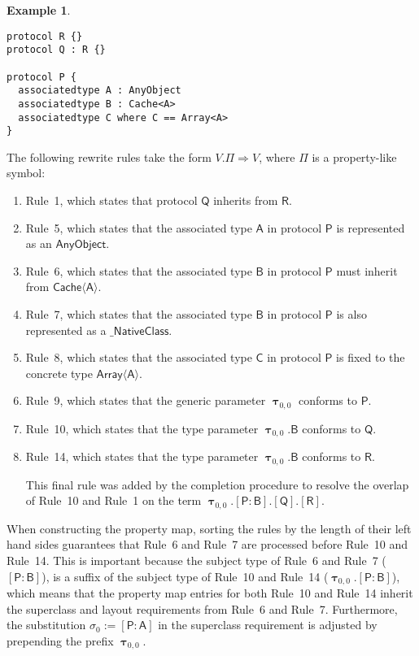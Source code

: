 \documentclass[headsepline,bibliography=totoc]{scrreport}
\newcommand{\namesym}[1]{\mathsf{#1}}
\newcommand{\proto}[1]{\bm{\mathsf{#1}}}
\newcommand{\protosym}[1]{[\proto{#1}]}
\newcommand{\genericsym}[2]{\bm{\uptau}_{#1,#2}}
\newcommand{\assocsym}[2]{[\proto{#1}\colon\namesym{#2}]}
\theoremstyle{definition}
\newtheorem{example}{Example}[chapter]
\theoremstyle{definition}
\theoremstyle{definition}
\begin{document}
\begin{example}
\begin{listing}
\begin{Verbatim}
protocol R {}
protocol Q : R {}

protocol P {
  associatedtype A : AnyObject
  associatedtype B : Cache<A>
  associatedtype C where C == Array<A>
}
\end{Verbatim}
\end{listing}
The following rewrite rules take the form $V.\Pi\Rightarrow V$, where $\Pi$ is a property-like symbol:
\begin{enumerate}
\item Rule~1, which states that protocol $\proto{Q}$ inherits from $\proto{R}$.
\item Rule~5, which states that the associated type $\namesym{A}$ in protocol $\proto{P}$ is represented as an $\namesym{AnyObject}$.
\item Rule~6, which states that the associated type $\namesym{B}$ in protocol $\proto{P}$ must inherit from $\namesym{Cache}\langle\namesym{A}\rangle$.
\item Rule~7, which states that the associated type $\namesym{B}$ in protocol $\proto{P}$ is also represented as a $\namesym{\_NativeClass}$.
\item Rule~8, which states that the associated type $\namesym{C}$ in protocol $\proto{P}$ is fixed to the concrete type $\namesym{Array}\langle\namesym{A}\rangle$.
\item Rule~9, which states that the generic parameter $\genericsym{0}{0}$ conforms to $\proto{P}$.
\item Rule~10, which states that the type parameter $\genericsym{0}{0}.\namesym{B}$ conforms to $\proto{Q}$.
\item Rule~14, which states that the type parameter $\genericsym{0}{0}.\namesym{B}$ conforms to $\proto{R}$.

This final rule was added by the completion procedure to resolve the overlap of Rule~10 and Rule~1 on the term $\genericsym{0}{0}.\assocsym{P}{B}.\protosym{Q}.\protosym{R}$.
\end{enumerate}
When constructing the property map, sorting the rules by the length of their left hand sides guarantees that Rule~6 and Rule~7 are processed before Rule~10 and Rule~14. This is important because the subject type of Rule~6 and Rule~7 ($\assocsym{P}{B}$), is a suffix of the subject type of Rule~10 and Rule~14 ($\genericsym{0}{0}.\assocsym{P}{B}$), which means that the property map entries for both Rule~10 and Rule~14 inherit the superclass and layout requirements from Rule~6 and Rule~7. Furthermore, the substitution $\sigma_0:=\assocsym{P}{A}$ in the superclass requirement is adjusted by prepending the prefix $\genericsym{0}{0}$.


\end{example}
\end{document}
